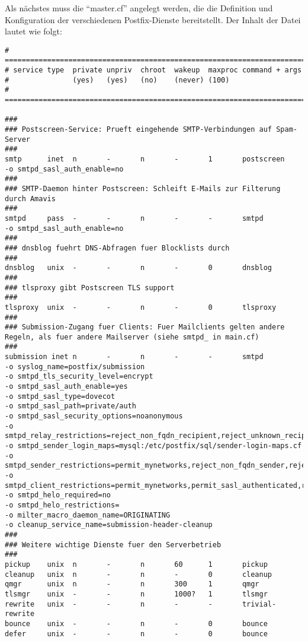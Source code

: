 Als nächstes muss die ``master.cf'' angelegt werden, die die Definition und Konfiguration der verschiedenen Postfix-Dienste bereitstellt. Der Inhalt der Datei lautet wie folgt:
\begin{lstlisting}[caption=master.cf - Postfix]
# ==========================================================================
# service type  private unpriv  chroot  wakeup  maxproc command + args
#               (yes)   (yes)   (no)    (never) (100)
# ==========================================================================

###
### Postscreen-Service: Prueft eingehende SMTP-Verbindungen auf Spam-Server
###
smtp      inet  n       -       n       -       1       postscreen
-o smtpd_sasl_auth_enable=no
###
### SMTP-Daemon hinter Postscreen: Schleift E-Mails zur Filterung durch Amavis
###
smtpd     pass  -       -       n       -       -       smtpd
-o smtpd_sasl_auth_enable=no
###
### dnsblog fuehrt DNS-Abfragen fuer Blocklists durch
###
dnsblog   unix  -       -       n       -       0       dnsblog
###
### tlsproxy gibt Postscreen TLS support
###
tlsproxy  unix  -       -       n       -       0       tlsproxy
###
### Submission-Zugang fuer Clients: Fuer Mailclients gelten andere Regeln, als fuer andere Mailserver (siehe smtpd_ in main.cf)
###
submission inet n       -       n       -       -       smtpd
-o syslog_name=postfix/submission
-o smtpd_tls_security_level=encrypt
-o smtpd_sasl_auth_enable=yes
-o smtpd_sasl_type=dovecot
-o smtpd_sasl_path=private/auth
-o smtpd_sasl_security_options=noanonymous
-o smtpd_relay_restrictions=reject_non_fqdn_recipient,reject_unknown_recipient_domain,permit_mynetworks,permit_sasl_authenticated,reject
-o smtpd_sender_login_maps=mysql:/etc/postfix/sql/sender-login-maps.cf
-o smtpd_sender_restrictions=permit_mynetworks,reject_non_fqdn_sender,reject_sender_login_mismatch,permit_sasl_authenticated,reject
-o smtpd_client_restrictions=permit_mynetworks,permit_sasl_authenticated,reject
-o smtpd_helo_required=no
-o smtpd_helo_restrictions=
-o milter_macro_daemon_name=ORIGINATING
-o cleanup_service_name=submission-header-cleanup
###
### Weitere wichtige Dienste fuer den Serverbetrieb
###
pickup    unix  n       -       n       60      1       pickup
cleanup   unix  n       -       n       -       0       cleanup
qmgr      unix  n       -       n       300     1       qmgr
tlsmgr    unix  -       -       n       1000?   1       tlsmgr
rewrite   unix  -       -       n       -       -       trivial-rewrite
bounce    unix  -       -       n       -       0       bounce
defer     unix  -       -       n       -       0       bounce

\end{lstlisting}
